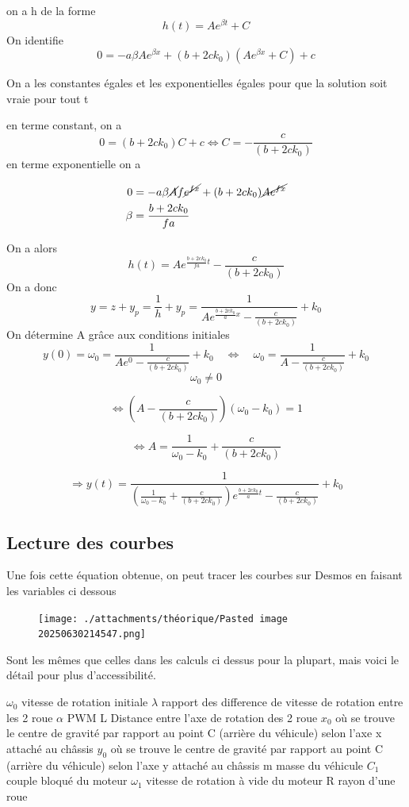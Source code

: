 \documentclass[a4paper,12pt]{report}  %
\begin{document}
on a h de la forme
$$h(t) = A e^{\beta t} + C$$
On identifie
$$0 = -a \beta A e^{\beta x} + (b + 2c k_0)( A e^{\beta x} + C)+ c$$

On a les constantes égales et les exponentielles égales pour que la solution soit vraie pour tout t 

en terme constant, on a
$$0 = (b + 2c k_0)C+c \Leftrightarrow C = -\frac{c}{(b + 2c k_0)}$$
en terme exponentielle on a 

\begin{align*}
	0 &= -a \beta \cancel{A}f  \cancel{e^{f x}} + (b + 2c k_0) \cancel{A e^{f x}}
	\\
	\beta &= \frac{b + 2c k_0}{fa}
\end{align*}

On a alors 
$$ h(t) = A e^{\frac{b + 2c k_0}{fa}t} - \frac{c}{(b + 2c k_0)}$$
On a donc
$$y = z + y_p =  \frac{1}{h} + y_p = \frac{1}{ A e^{\frac{b + 2c k_0}{a}x} - \frac{c}{(b + 2c k_0)}} + k_0$$
On détermine A grâce aux conditions initiales
$$y(0) = \omega_0 = \frac{1}{ A e^0 - \frac{c}{(b + 2c k_0)}} + k_0 \quad\Leftrightarrow \quad \omega_0 = \frac{1}{A - \frac{c}{(b + 2c k_0)}} + k_0$$
$$\omega_0 \neq 0$$

$$\Leftrightarrow (A-\frac{c}{(b + 2c k_0)})(\omega_0-k_0) = 1$$


$$\Leftrightarrow A = \frac{1}{\omega_0-k_0} + \frac{c}{(b + 2c k_0)}$$

$$\Rightarrow y(t) = \frac{1}{(\frac{1}{\omega_0-k_0} + \frac{c}{(b + 2c k_0)}) e^{\frac{b + 2c k_0}{a}t} - \frac{c}{(b + 2c k_0)}} + k_0$$

\subsection{Lecture des courbes}
Une fois cette équation obtenue, on peut tracer les courbes sur Desmos en faisant les variables ci dessous 
\begin{figure}[H]
	\centering
	\texttt{[image: ./attachments/théorique/Pasted image 20250630214547.png]}
	\caption{}
\end{figure}

Sont les mêmes que celles dans les calculs ci dessus pour la plupart, mais voici le détail pour plus d'accessibilité. 

$\omega_0$ vitesse de rotation initiale 
$\lambda$ rapport des difference de vitesse de rotation entre les 2 roue 
$\alpha$ PWM
L Distance entre l'axe de rotation des 2 roue 
$x_0$ où se trouve le centre de gravité par rapport au point C (arrière du véhicule) selon l'axe x attaché au châssis
$y_0$ où se trouve le centre de gravité par rapport au point C (arrière du véhicule) selon l'axe y attaché au châssis
m masse du véhicule
$C_1$ couple bloqué du moteur
$\omega_1$ vitesse de rotation à vide du moteur
R rayon d'une roue 
\end{document}
